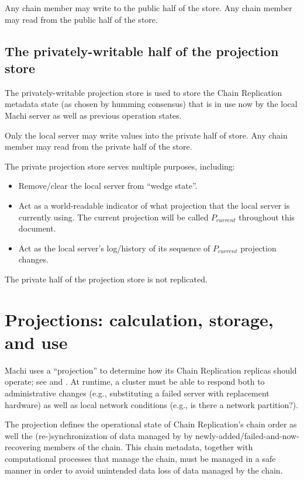 \documentclass[preprint,10pt]{sigplanconf}
\begin{document}
Any chain member may write to the public half of the store.
Any chain member may read from the public half of the store.

\subsection{The privately-writable half of the projection store}

The privately-writable projection store is used to store the
Chain Replication metadata state (as chosen by humming consensus)
that is in use now by the local Machi server as well as previous
operation states.

Only the local server may write values into the private half of store.
Any chain member may read from the private half of the store.

The private projection store serves multiple purposes, including:

\begin{itemize}
\item Remove/clear the local server from ``wedge state''.
\item Act as a world-readable indicator of what projection that the
  local server is currently using.  The current projection will be
  called $P_{current}$ throughout this document.
\item Act as the local server's log/history of
  its sequence of $P_{current}$ projection changes.
\end{itemize}

The private half of the projection store is not replicated.

\section{Projections: calculation, storage, and use}
\label{sec:projections}

Machi uses a ``projection'' to determine how its Chain Replication replicas
should operate; see \cite{machi-design} and
\cite{corfu1}.  At runtime, a cluster must be able to respond both to
administrative changes (e.g., substituting a failed server with
replacement hardware) as well as local network conditions (e.g., is
there a network partition?).

The projection defines the operational state of Chain Replication's
chain order as well the (re-)synchronization of data managed by by
newly-added/failed-and-now-recovering members of the chain.  This
chain metadata, together with computational processes that manage the
chain, must be managed in a safe manner in order to avoid unintended
data loss of data managed by the chain.
\end{document}
